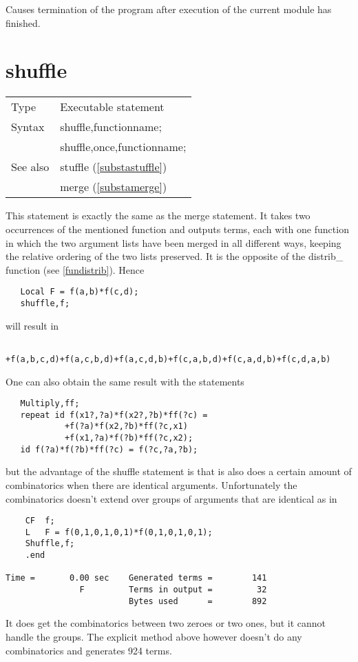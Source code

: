 \noindent Causes termination of the 
program after execution of the current module has 
finished. \vspace{10mm}

%
\section{shuffle}
\label{substashuffle}

\noindent \begin{tabular}{ll}
Type & Executable statement\\
Syntax & shuffle,functionname; \\
       & shuffle,once,functionname;
\\ See also & stuffle (\ref{substastuffle}) \\
            & merge (\ref{substamerge})
\end{tabular} \vspace{4mm}

\noindent This statement is exactly the same as the merge 
statement. It takes two occurrences of the mentioned function and outputs 
terms, each with one function in which the two argument lists have been 
merged in all different ways, keeping the relative ordering of the two 
lists preserved. It is the opposite of the 
distrib\_ function (see 
\ref{fundistrib}). Hence
\begin{verbatim}
   Local F = f(a,b)*f(c,d);
   shuffle,f;
\end{verbatim}
will result in
\begin{verbatim}
      +f(a,b,c,d)+f(a,c,b,d)+f(a,c,d,b)+f(c,a,b,d)+f(c,a,d,b)+f(c,d,a,b)
\end{verbatim}
One can also obtain the same result with the statements
\begin{verbatim}
   Multiply,ff;
   repeat id f(x1?,?a)*f(x2?,?b)*ff(?c) =
            +f(?a)*f(x2,?b)*ff(?c,x1)
            +f(x1,?a)*f(?b)*ff(?c,x2);
   id f(?a)*f(?b)*ff(?c) = f(?c,?a,?b);
\end{verbatim}
but the advantage of the shuffle statement is that is also does a certain 
amount of combinatorics when there are identical arguments. Unfortunately 
the combinatorics doesn't extend over groups of arguments that are 
identical as in
\begin{verbatim}
    CF  f;
    L   F = f(0,1,0,1,0,1)*f(0,1,0,1,0,1);
    Shuffle,f;
    .end

Time =       0.00 sec    Generated terms =        141
               F         Terms in output =         32
                         Bytes used      =        892
\end{verbatim}
It does get the combinatorics between two zeroes or two ones, but it cannot 
handle the groups. The explicit method above however doesn't do any 
combinatorics and generates 924 terms.

